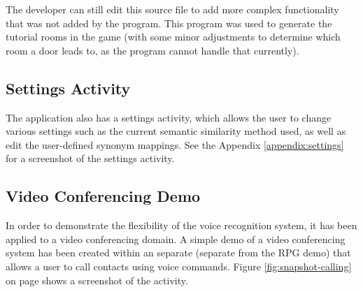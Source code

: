 \documentclass[11pt]{article}
\begin{document}
The developer can still edit this source file to add more complex functionality that was not added by the program. This program was used to generate the tutorial rooms in the game (with some minor adjustments to determine which room a door leads to, as the program cannot handle that currently).

\subsection{Settings Activity}

The application also has a settings activity, which allows the user to change various settings such as the current semantic similarity method used, as well as edit the user-defined synonym mappings. See the Appendix \ref{appendix:settings} for a screenshot of the settings activity.

\subsection{Video Conferencing Demo}

In order to demonstrate the flexibility of the voice recognition system, it has been applied to a video conferencing domain. A simple demo of a video conferencing system has been created within an separate (separate from the RPG demo) that allows a user to call contacts using voice commands. Figure \ref{fig:snapshot-calling} on page \pageref{fig:snapshot-calling} shows a screenshot of the activity.
\end{document}

